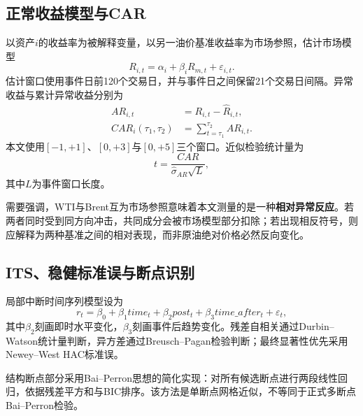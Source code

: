 \documentclass[UTF8,zihao=-4,a4paper]{ctexart}
\begin{document}
\begin{table}[H]
  \centering
  \caption{候选事件所在ACLED周的冲突强度}
  \label{tab:event-week}
  \small
  \resizebox{\textwidth}{!}{}
\end{table}

\subsection{正常收益模型与CAR}

以资产$i$的收益率为被解释变量，以另一油价基准收益率为市场参照，估计市场模型
\begin{equation}
  R_{i,t}=\alpha_i+\beta_iR_{m,t}+\varepsilon_{i,t}.
  \label{eq:market}
\end{equation}
估计窗口使用事件日前120个交易日，并与事件日之间保留21个交易日间隔。异常收益与累计异常收益分别为
\begin{align}
  AR_{i,t}&=R_{i,t}-\widehat{R}_{i,t},\\
  CAR_i(\tau_1,\tau_2)&=\sum_{t=\tau_1}^{\tau_2}AR_{i,t}.
  \label{eq:car}
\end{align}
本文使用$[-1,+1]$、$[0,+3]$与$[0,+5]$三个窗口。近似检验统计量为
\begin{equation}
  t=\frac{CAR}{\widehat{\sigma}_{AR}\sqrt{L}},
  \label{eq:tstat}
\end{equation}
其中$L$为事件窗口长度。

需要强调，WTI与Brent互为市场参照意味着本文测量的是一种\textbf{相对异常反应}。若两者同时受到同方向冲击，共同成分会被市场模型部分扣除；若出现相反符号，则应解释为两种基准之间的相对表现，而非原油绝对价格必然反向变化。

\subsection{ITS、稳健标准误与断点识别}

局部中断时间序列模型设为
\begin{equation}
 r_t=\beta_0+\beta_1 time_t+\beta_2 post_t+\beta_3 time\_after_t+\varepsilon_t,
 \label{eq:its}
\end{equation}
其中$\beta_2$刻画即时水平变化，$\beta_3$刻画事件后趋势变化。残差自相关通过Durbin--Watson统计量判断，异方差通过Breusch--Pagan检验判断；最终显著性优先采用Newey--West HAC标准误\cite{neweywest1987}。

结构断点部分采用Bai--Perron思想的简化实现：对所有候选断点进行两段线性回归，依据残差平方和与BIC排序。该方法是单断点网格近似，不等同于正式多断点Bai--Perron检验。
\end{document}
